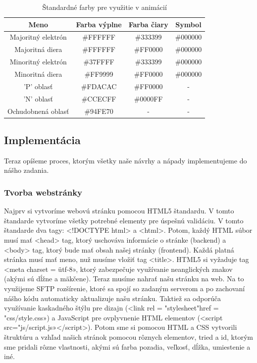 \begin{table}[!htbp]
\caption{Štandardné farby pre využitie v animácií}
\label{Farby}
\begin{center}
\begin{tabular}{ |c|c|c|c| } 
\hline
Meno & Farba výplne & Farba čiary & Symbol\\ \hline
Majoritný elektrón & \#FFFFFF & \#333399 & \#000000 \\ \hline
Majoritná diera & \#FFFFFF & \#FF0000 & \#000000 \\ \hline
Minoritný elektrón & \#37FFFF & \#333399 & \#000000 \\ \hline
Minoritná diera & \#FF9999 & \#FF0000 & \#000000 \\ \hline
'P' oblasť & \#FDACAC & \#FF0000 & - \\ \hline
'N' oblasť & \#CCECFF & \#0000FF & - \\ \hline
Ochudobnená oblasť & \#94FE70 & - & - \\ \hline
\end{tabular}
\end{center}
\end{table}

\subsection{Implementácia}
Teraz opíšeme proces, ktorým všetky naše návrhy a nápady implementujeme do nášho zadania.

\subsubsection{Tvorba webstránky}
Najprv si vytvoríme webovú stránku pomocou HTML5 štandardu. V tomto štandarde vytvoríme všetky potrebné elementy pre úspešnú validáciu. V tomto štandarde dva tagy: <!DOCTYPE html> a <html>. Potom, každý HTML súbor musí mať <head> tag, ktorý uschováva informácie o stránke (backend) a <body> tag, ktorý bude mať obsah našej stránky (frontend). Každá platná stránka musí mať meno, nuž musíme vložiť tag <title>. HTML5 si vyžaduje tag <meta charset = ütf-8», ktorý zabezpečuje využívanie neanglických znakov (akými sú dĺžne a mäkčene). Teraz musíme nahrať našu stránku na web. Na to využijeme SFTP rozšírenie, ktoré sa spojí so zadaným serverom a po zachovaní nášho kódu automaticky  aktualizuje našu stránku. Taktiež sa odporúča využívanie kaskadného štýlu pre dizajn (<link rel = "stylesheet"href = "css/style.css») a JavaScript pre ovplyvnenie  HTML elementov (<script src="js/script.js»</script>). Potom sme si pomocou HTML a CSS vytvorili štruktúru a vzhľad našich stránok pomocou rôznych elementov, tried a id, ktorým sme pridali rôzne vlastnosti, akými sú farba pozadia, veľkosť, dĺžka, umiestenie a iné.

